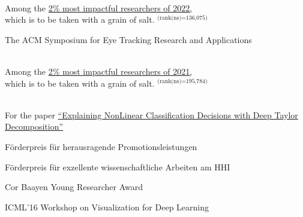 

{
    \ifdefined\shortcv
        {}
    \else
        {
            \\
            \hspace*{\fill}Among the \href{https://elsevier.digitalcommonsdata.com/datasets/btchxktzyw/6}{2\% most impactful researchers of 2022,}\\
            \hspace*{\fill}which is to be taken with a grain of salt. $^\text{(rank(ns)=136,075)}$
        }
    \fi
}

{
    \ifdefined\shortcv
        {}
    \else
        {
            The ACM Symposium for Eye Tracking Research and Applications
        }
    \fi
}

{    
\ifdefined\shortcv
    {}
\else
    {
        \\
        \hspace*{\fill} Among the \href{https://elsevier.digitalcommonsdata.com/datasets/btchxktzyw/4}{2\% most impactful researchers of 2021,}\\
        \hspace*{\fill}which is to be taken with a grain of salt. $^\text{(rank(ns)=195,784)}$
    }
\fi
}

{
    \ifdefined\shortcv
        {}
    \else
        {
            \\
            \hspace*{\fill} For the paper
            \href{https://doi.org/10.1016/j.patcog.2016.11.008}{``Explaining NonLinear Classification Decisions with Deep Taylor Decomposition''}
        }
    \fi
}


{
    \ifdefined\shortcv
        {}
    \else
        {
            F\"orderpreis f\"ur herausragende Promotionsleistungen
        }
    \fi
}


{
    \ifdefined\shortcv
        {}
    \else
        {
            F\"orderpreis f\"ur exzellente wissenschaftliche Arbeiten am HHI
        }
    \fi
}


{
    \ifdefined\shortcv
        {}
    \else
        {
            Cor Baayen Young Researcher Award
        }
    \fi
}


{
    \ifdefined\shortcv
        {}
    \else
        {
            ICML'16 Workshop on Visualization for Deep Learning
        }
    \fi
}


